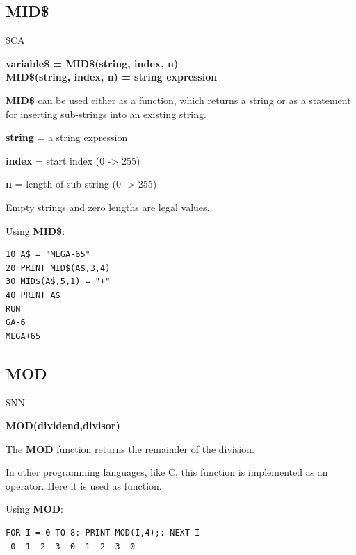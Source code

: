 \subsection{MID\$}
\begin{description}[leftmargin=2cm,style=nextline]
\item [Token:] \$CA
\item [Format:] {\bf variable\$ = MID\$(string, index, n)} \\
                {\bf MID\$(string, index, n) = string expression}
\item [Usage:]  {\bf MID\$} can be used either as a function,
                which returns a string or as a statement for
                inserting sub-strings into an existing string.

               {\bf string} = a string expression

               {\bf index} = start index (0 -> 255)

               {\bf n} = length of sub-string (0 -> 255)

\item [Remarks:] Empty strings and zero lengths are legal values.

\item [Example:] Using {\bf MID\$}:
\begin{tcolorbox}[colback=black,coltext=white]
\verbatimfont{\codefont}
\begin{verbatim}
10 A$ = "MEGA-65"
20 PRINT MID$(A$,3,4)
30 MID$(A$,5,1) = "+"
40 PRINT A$
RUN
GA-6
MEGA+65
\end{verbatim}
\end{tcolorbox}
\end{description}


\newpage
\subsection{MOD}
\begin{description}[leftmargin=2cm,style=nextline]
\item [Token:] \$NN
\item [Format:] {\bf MOD(dividend,divisor)}
\item [Usage:] The {\bf MOD} function returns the remainder of the
      division.
\item [Remarks:] In other programming languages, like C, this function
      is implemented as an operator. Here it is used as function.

\item [Example:] Using {\bf MOD}:
\begin{tcolorbox}[colback=black,coltext=white]
\verbatimfont{\codefont}
\begin{verbatim}
FOR I = 0 TO 8: PRINT MOD(I,4);: NEXT I
 0  1  2  3  0  1  2  3  0
\end{verbatim}
\end{tcolorbox}
\end{description}

